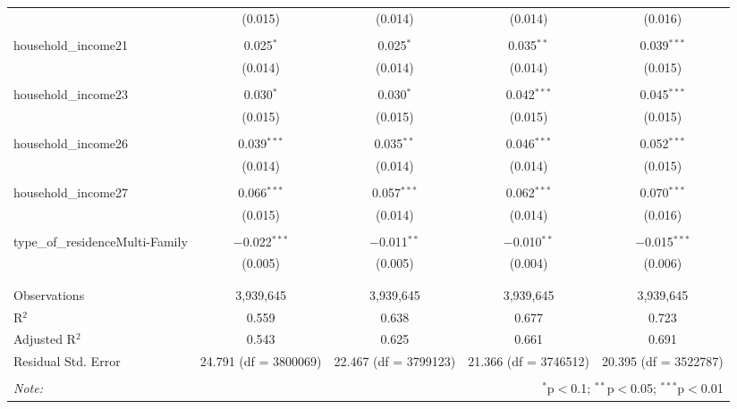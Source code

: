 \begin{table}[!htbp]
\begin{tabular}{@{\extracolsep{5pt}}lcccc}
  & (0.015) & (0.014) & (0.014) & (0.016) \\ 
  & & & & \\ 
 household\_income21 & 0.025$^{*}$ & 0.025$^{*}$ & 0.035$^{**}$ & 0.039$^{***}$ \\ 
  & (0.014) & (0.014) & (0.014) & (0.015) \\ 
  & & & & \\ 
 household\_income23 & 0.030$^{*}$ & 0.030$^{*}$ & 0.042$^{***}$ & 0.045$^{***}$ \\ 
  & (0.015) & (0.015) & (0.015) & (0.015) \\ 
  & & & & \\ 
 household\_income26 & 0.039$^{***}$ & 0.035$^{**}$ & 0.046$^{***}$ & 0.052$^{***}$ \\ 
  & (0.014) & (0.014) & (0.014) & (0.015) \\ 
  & & & & \\ 
 household\_income27 & 0.066$^{***}$ & 0.057$^{***}$ & 0.062$^{***}$ & 0.070$^{***}$ \\ 
  & (0.015) & (0.014) & (0.014) & (0.016) \\ 
  & & & & \\ 
 type\_of\_residenceMulti-Family & $-$0.022$^{***}$ & $-$0.011$^{**}$ & $-$0.010$^{**}$ & $-$0.015$^{***}$ \\ 
  & (0.005) & (0.005) & (0.004) & (0.006) \\ 
  & & & & \\ 
\hline \\[-1.8ex] 
Observations & 3,939,645 & 3,939,645 & 3,939,645 & 3,939,645 \\ 
R$^{2}$ & 0.559 & 0.638 & 0.677 & 0.723 \\ 
Adjusted R$^{2}$ & 0.543 & 0.625 & 0.661 & 0.691 \\ 
Residual Std. Error & 24.791 (df = 3800069) & 22.467 (df = 3799123) & 21.366 (df = 3746512) & 20.395 (df = 3522787) \\ 
\hline 
\hline \\[-1.8ex] 
\textit{Note:}  & \multicolumn{4}{r}{$^{*}$p$<$0.1; $^{**}$p$<$0.05; $^{***}$p$<$0.01} \\ 
\end{tabular} 
\end{table} 
